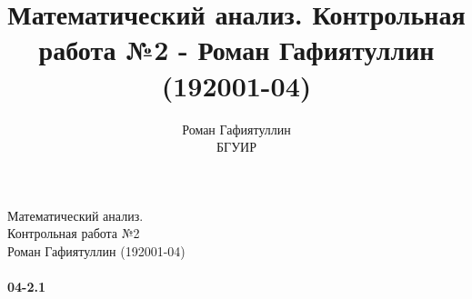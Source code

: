 \documentclass[12pt]{article}
\title{Математический анализ. Контрольная работа №2 - Роман Гафиятуллин (192001-04)}
\author{Роман Гафиятуллин\\ БГУИР}
\begin{document}
	\begin{titlepage}
		\begin{center}
			{\Large Математический анализ. \\ Контрольная работа №2 \\ Роман Гафиятуллин (192001-04)}
		\end{center}
	\end{titlepage}
	\clearpage
	\paragraph{04-2.1}
\end{document}
